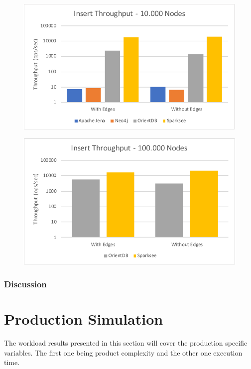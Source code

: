 \begin{figure}[h!]
  \begin{minipage}{.5\textwidth}
    \centering
    \includegraphics[width=\textwidth]{images/throughput/indexNoEdges10000Nodes}
    \label{fig:indexNoEdges10000Nodes}
  \end{minipage}
  \begin{minipage}{.5\textwidth}
    \centering
    \includegraphics[width=\textwidth]{images/throughput/indexNoEdges100000Nodes}
    \label{fig:indexNoEdges100000Nodes}
  \end{minipage}
\end{figure}

\subsubsection{Discussion}

\section{Production Simulation}
\label{ch:evaluation:se:productionSimulation}
The workload results presented in this section will cover the production specific variables.
The first one being product complexity and the other one execution time.

